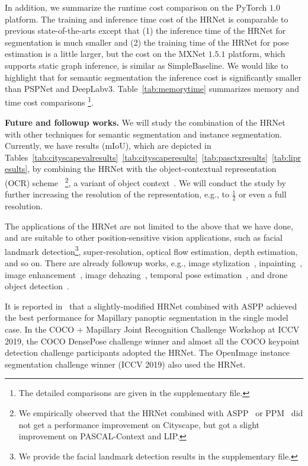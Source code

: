 \documentclass[10pt,journal,compsoc]{IEEEtran}
\begin{document}
{
In addition,
we summarize the runtime cost comparison
on the PyTorch $1.0$ platform.
The training and inference time cost of the HRNet
    is comparable to previous state-of-the-arts
    except that (1) the inference time of the HRNet for segmentation is much smaller
    and (2) the training time of the HRNet
    for pose estimation is a little larger,
    but the cost on the MXNet $1.5.1$ platform,
which supports static graph inference,
is similar as SimpleBaseline.
We would like to highlight
that for semantic segmentation
the inference cost is significantly smaller
than PSPNet and DeepLabv$3$.
Table~\ref{tab:memorytime}
summarizes memory and time cost comparisons \footnote{The detailed comparisons 
are given in the supplementary file.}.
}

\vspace{1mm}
\noindent\textbf{Future and followup works.}
We will study the combination of the HRNet
with other techniques for semantic segmentation and
instance segmentation. 
Currently, we have results (mIoU),
which are depicted in Tables~\ref{tab:cityscapevalresults}~\ref{tab:cityscaperesults}~\ref{tab:pasctxresults}~\ref{tab:lipresults},
by combining the HRNet with the object-contextual representation
(OCR) scheme~\cite{YuanCW18}
\footnote{We empirically observed
that the HRNet combined with ASPP~\cite{ChenPSA17}
or PPM~\cite{ZhaoSQWJ17}
did not get a performance improvement on Cityscape,
but got a slight improvement on PASCAL-Context and LIP.},
a variant of object context~\cite{YuanW18, HuangYGZCW19}.
{We will
conduct the study by further 
increasing the resolution
of the representation,
e.g., to $\frac{1}{2}$ or even a full resolution.}



The applications of the HRNet
are not limited to 
the above that we have done,
and are suitable to other position-sensitive 
vision applications,
such as 
facial landmark detection\footnote{
We provide the facial landmark detection results
in the supplementary file.},
super-resolution,
optical flow estimation,
depth estimation,
and so on.
There are already followup works,
e.g., image stylization~\cite{LiYL19},
inpainting~\cite{GuoCYCL19},
image enhancement~\cite{Ignatov_2019_CVPR_Workshops},
image dehazing~\cite{Ancuti_2019_CVPR_Workshops},
temporal pose estimation~\cite{BertasiusFTST19},
{and drone object detection~\cite{Zhu_2019_ICCV}}.

{
It is reported in~\cite{ChengCZLHAC19}
that a slightly-modified HRNet
combined with ASPP achieved
the best performance for Mapillary panoptic segmentation
in the single model case.
In the COCO + Mapillary Joint Recognition Challenge Workshop at ICCV 2019,
the COCO DensePose challenge winner
and almost all the COCO keypoint detection challenge participants adopted the HRNet.
The OpenImage instance segmentation challenge winner
(ICCV 2019)
also used the HRNet.}
\end{document}
